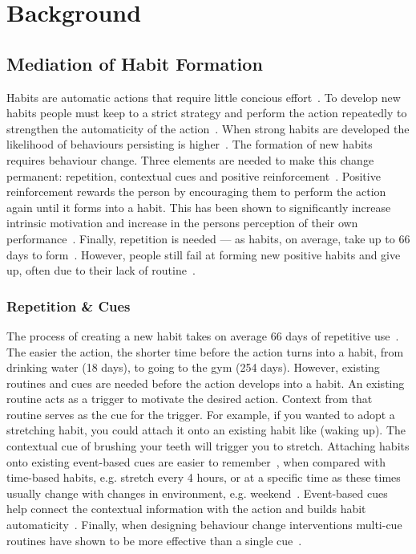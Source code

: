 \documentclass{scaffold/sigchi}
\begin{document}
\section{Background}
\subsection{Mediation of Habit Formation}
Habits are automatic actions that require little concious effort~\cite{article_the_habitual_consumer}. To develop new habits people must keep to a strict strategy and perform the action repeatedly to strengthen the automaticity of the action~\cite{article_promoting_habit_formation}. When strong habits are developed the likelihood of behaviours persisting is higher~\cite{putting_habit_into_practice}. The formation of new habits requires behaviour change. Three elements are needed to make this change permanent: repetition, contextual cues and positive reinforcement~\cite{article_experiences_of_habit_formation}. Positive reinforcement rewards the person by encouraging them to perform the action again until it forms into a habit. This has been shown to significantly increase intrinsic motivation and increase in the persons perception of their own performance~\cite{positive_reinforcement_pro}. Finally, repetition is needed --- as habits, on average, take up to 66 days to form~\cite{article_how_habits_formed_modelling_habit_formation}.
However, people still fail at forming new positive habits and give up, often due to their lack of routine~\cite{article_promoting_habit_formation, article_the_habitual_consumer}.



\subsubsection{Repetition \& Cues}
The process of creating a new habit takes on average 66 days of repetitive use~\cite{article_how_habits_formed_modelling_habit_formation}. The easier the action, the shorter time before the action turns into a habit, from drinking water (18 days), to going to the gym (254 days). However, existing routines and cues are needed before the action develops into a habit. An existing routine acts as a trigger to motivate the desired action. Context from that routine serves as the cue for the trigger. For example, if you wanted to adopt a stretching habit, you could attach it onto an existing habit like (waking up). The contextual cue of brushing your teeth will trigger you to stretch. Attaching habits onto existing event-based cues are easier to remember~\cite{article_implementation_intentions_multicue}, when compared with time-based habits, e.g. stretch every 4 hours, or at a specific time as these times usually change with changes in environment, e.g. weekend~\cite{coaching_not_that_good}. Event-based cues help connect the contextual information with the action and builds habit automaticity~\cite{article_implementation_intentions}. Finally, when designing behaviour change interventions multi-cue routines have shown to be more effective than a single cue~\cite{article_understanding_use_contextual_cues_design_impl}.
\end{document}
